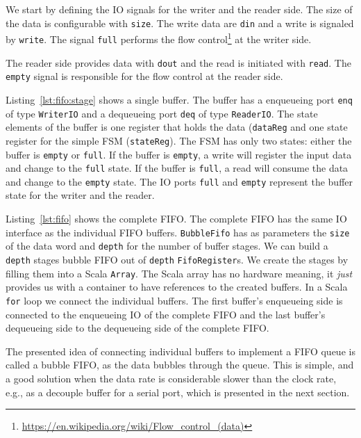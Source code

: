 \documentclass[%
    10pt,
    headinclude, footexclude,
    openright, %
    notitlepage,
    cleardoubleempty,
    headsepline,
    pointlessnumbers,
    bibtotoc, idxtotoc,
    ]{scrbook}
\newcommand{\code}[1]{{\small{\texttt{#1}}}}
\newcommand{\myref}[2]{\href{#1}{#2}}
\renewcommand{\myref}[2]{{#2}{\footnote{\url{#1}}}}
\begin{document}
We start by defining the IO signals for the writer and the reader side.
The size of the data is configurable with \code{size}.
The write data are \code{din} and a write is signaled by \code{write}.
The signal \code{full} performs the
\myref{https://en.wikipedia.org/wiki/Flow_control_(data)}{flow control}
at the writer side.


The reader side provides data with \code{dout} and the read is initiated
with \code{read}. The \code{empty} signal is responsible for the flow control
at the reader side.


Listing~\ref{lst:fifo:stage} shows a single buffer. The buffer has a enqueueing port
\code{enq} of type \code{WriterIO} and a dequeueing port \code{deq} of type
\code{ReaderIO}. The state elements of the buffer is one register that holds the
data (\code{dataReg} and one state register for the simple FSM (\code{stateReg}).
The FSM has only two states: either the buffer is \code{empty} or \code{full}.
If the buffer is \code{empty}, a write will register the input data and change
to the \code{full} state.
If the buffer is \code{full}, a read will consume the data and change to the
\code{empty} state.
The IO ports \code{full} and \code{empty} represent the buffer state for
the writer and the reader.


Listing~\ref{lst:fifo} shows the complete FIFO. The complete FIFO has
the same IO interface as the individual FIFO buffers.
\code{BubbleFifo} has as parameters the \code{size} of the data
word and \code{depth} for the number of buffer stages.
We can build a \code{depth} stages bubble FIFO out of \code{depth}
\code{FifoRegister}s. We create the stages by filling them into a Scala \code{Array}.
The Scala array has no hardware meaning, it \emph{just} provides us with
a container to have references to the created buffers.
In a Scala \code{for} loop we connect the individual buffers.
The first buffer's enqueueing side is connected to the enqueueing IO of
the complete FIFO and the last buffer's dequeueing side to the
dequeueing side of the complete FIFO.


The presented idea of connecting individual buffers to implement a FIFO
queue is called a bubble FIFO, as the data bubbles through the queue.
This is simple, and a good solution when the data rate is considerable slower
than the clock rate, e.g., as a decouple buffer for a serial port, which is presented
in the next section.
\end{document}
